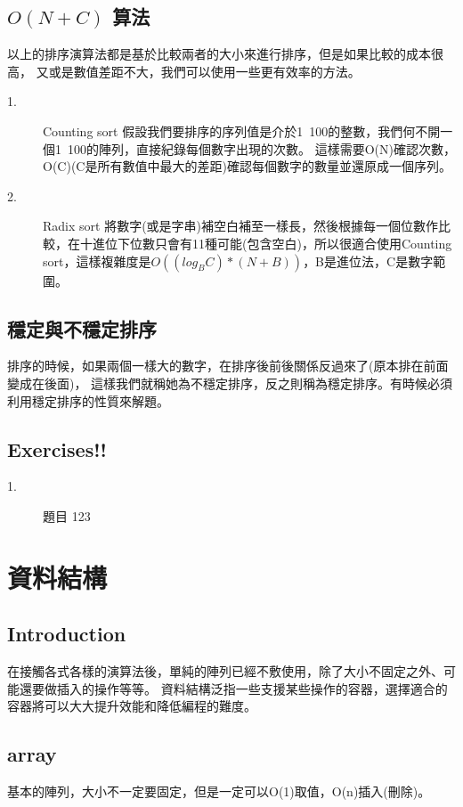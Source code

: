 \documentclass{article}
\begin{document}
\subsection{ $O(N + C)$ 算法}
以上的排序演算法都是基於比較兩者的大小來進行排序，但是如果比較的成本很高，
又或是數值差距不大，我們可以使用一些更有效率的方法。
\begin{description}
\item[ 1.]Counting sort
假設我們要排序的序列值是介於1~100的整數，我們何不開一個1~100的陣列，直接紀錄每個數字出現的次數。
這樣需要O(N)確認次數，O(C)(C是所有數值中最大的差距)確認每個數字的數量並還原成一個序列。
\item[ 2.]Radix sort
將數字(或是字串)補空白補至一樣長，然後根據每一個位數作比較，在十進位下位數只會有11種可能(包含空白)，所以很適合使用Counting sort，這樣複雜度是$O((log_B C) * (N + B))$，B是進位法，C是數字範圍。
\end{description} 

\subsection{穩定與不穩定排序}
排序的時候，如果兩個一樣大的數字，在排序後前後關係反過來了(原本排在前面變成在後面)，
這樣我們就稱她為不穩定排序，反之則稱為穩定排序。有時候必須利用穩定排序的性質來解題。


\subsection{Exercises!!}
\begin{description}
\item[ 1.]題目
123
\end{description} 


\section{資料結構}

\subsection*{Introduction}
在接觸各式各樣的演算法後，單純的陣列已經不敷使用，除了大小不固定之外、可能還要做插入的操作等等。
資料結構泛指一些支援某些操作的容器，選擇適合的容器將可以大大提升效能和降低編程的難度。

\subsection{array}
基本的陣列，大小不一定要固定，但是一定可以O(1)取值，O(n)插入(刪除)。
\end{document}
